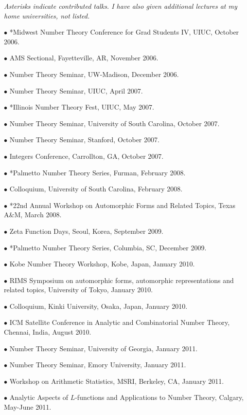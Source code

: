 \documentclass{article}
\newcommand{\categorywidth}{1in}        %
\newcommand{\infowidth}{5.8in}          %
\newcommand{\categorysep}{5pt}
\newcommand{\catlistlabel}[1]%
{\raisebox{0pt}[1ex][0pt]{\makebox[\labelwidth][l]%
    {\parbox[t]{\labelwidth}{\hspace{0pt}\textbf{#1}}}}}
\newenvironment{categories}{\begin{list}{}{
      \setlength{\labelwidth}{\categorywidth}
      \setlength{\leftmargin}{\labelwidth}
      \addtolength{\leftmargin}{\labelsep}
      \setlength{\topsep}{20pt}
      \setlength{\itemsep}{\categorysep}
      \renewcommand{\makelabel}{\catlistlabel}
      }}{\end{list}}
\newcommand{\category}[1]{\item[#1]}
\newcommand{\rawentry}[1]{{\begin{minipage}[t]{\infowidth}{#1}
    \end{minipage}}}
\begin{document}
\begin{flushleft}
\begin{categories}
{\category{Research Talks}

\rawentry{\itshape Asterisks indicate contributed talks. I have also given additional lectures
at my home universities, not listed.}

$\bullet$ {*Midwest Number Theory Conference for Grad Students IV\upshape, UIUC, October 2006.}

$\bullet$ {AMS Sectional, Fayetteville, AR, November 2006.}

$\bullet$ {Number Theory Seminar, UW-Madison, December 2006.}

$\bullet$ {Number Theory Seminar, UIUC, April 2007.}

$\bullet$ {*Illinois Number Theory Fest, UIUC, May 2007.}

$\bullet$ {Number Theory Seminar,
University of South Carolina, October 2007.}

$\bullet$ {Number Theory Seminar,
Stanford, October 2007.}

$\bullet$ {Integers Conference, Carrollton, GA, October 2007.}

$\bullet$ {*Palmetto Number Theory Series, Furman, February 2008.}

$\bullet$ {Colloquium, University of South Carolina, February 2008.}

$\bullet$ {*22nd Annual Workshop on Automorphic
Forms and Related Topics, Texas A\&M, March 2008.}

$\bullet$ Zeta Function Days,
Seoul, Korea, September 2009.

$\bullet$ *Palmetto Number Theory Series,
Columbia, SC, December 2009.

$\bullet$ Kobe Number Theory Workshop,
Kobe, Japan, January 2010.

$\bullet$ RIMS Symposium on automorphic
forms, automorphic representations and related topics, University of Tokyo, January 2010.

$\bullet$ Colloquium, Kinki University,
Osaka, Japan, January 2010.

$\bullet$ 
ICM Satellite Conference in Analytic and Combinatorial Number Theory, Chennai, India, August 2010.

$\bullet$ Number Theory Seminar,
University of Georgia, January 2011.

$\bullet$ 
Number Theory Seminar, Emory University, January 2011.

$\bullet$ 
Workshop on Arithmetic Statistics, MSRI, Berkeley, CA, January 2011.

$\bullet$ 
Analytic Aspects of $L$-functions and Applications to Number Theory,
Calgary, May-June 2011.

}
\end{categories}
\end{flushleft}
\end{document}

